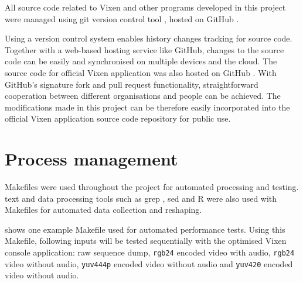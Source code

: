All source code related to Vixen and other programs developed in this project were managed using git version control tool \cite{git}, hosted on GitHub \cite{github} \cite{github_vixen_yz} \cite{github_project}.

Using a version control system enables history changes tracking for source code. Together with a web-based hosting service like GitHub, changes to the source code can be easily  and synchronised on multiple devices and the cloud. The source code for official Vixen application was also hosted on GitHub \cite{github_vixen}. With GitHub's signature fork and pull request functionality, straightforward cooperation between different organisations and people can be achieved. The modifications made in this project can be therefore easily incorporated into the official Vixen application source code repository for public use.

\section{Process management}

Makefiles \cite{make} were used throughout the project for automated processing and testing.  text and data processing tools such as grep \cite{grep}, sed \cite{sed} and R \cite{r_project} were also used with Makefiles for automated data collection and reshaping.

 shows one example Makefile used for automated performance tests. Using this Makefile,  following inputs will be tested sequentially with the optimised Vixen console application: raw sequence dump, \texttt{rgb24} encoded video with audio, \texttt{rgb24} video without audio, \texttt{yuv444p} encoded video without audio and \texttt{yuv420} encoded video without audio.
